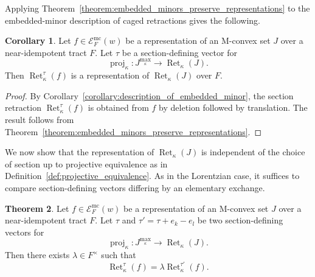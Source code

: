 \documentclass[11pt]{article}
\theoremstyle{definition}
\newtheorem{theorem}{Theorem}[section]
\newtheorem{corollary}[theorem]{Corollary}
\theoremstyle{remark}
\DeclareMathOperator{\proj}{proj}              %
\newcommand{\kproj}{\proj_{\kappa}}            %
\DeclareMathOperator{\Ret}{Ret}                %
\newcommand{\RetK}{\Ret_{\kappa}}              %
\newcommand{\Jmax}{J^{\max_{\kappa}}}
\begin{document}
Applying Theorem~\ref{theorem:embedded_minors_preserve_representations} to the embedded-minor description of caged retractions gives the following.

\begin{corollary}\label{corollary:section_retraction_representation}
    Let $f\in\mathcal{E}^{\mathrm{mc}}_F(w)$ be a representation of an M-convex set $J$ over a near-idempotent tract $F$. Let $\tau$ be a section-defining vector for
    \[
        \kproj\colon\Jmax\to\RetK(J).
    \]
    Then $\RetK^\tau(f)$ is a representation of $\RetK(J)$ over $F$.
\end{corollary}

\begin{proof}
    By Corollary~\ref{corollary:description_of_embedded_minor}, the section retraction $\RetK^\tau(f)$ is obtained from $f$ by deletion followed by translation. The result follows from Theorem~\ref{theorem:embedded_minors_preserve_representations}.
\end{proof}

We now show that the representation of $\RetK(J)$ is independent of the choice of section up to projective equivalence as in Definition~\ref{def:projective_equivalence}. As in the Lorentzian case, it suffices to compare section-defining vectors differing by an elementary exchange.

\begin{theorem}\label{theorem:representations_projective_equivalence}
    Let $f\in\mathcal{E}^{\mathrm{mc}}_F(w)$ be a representation of an M-convex set $J$ over a near-idempotent tract $F$. Let $\tau$ and $\tau'=\tau+e_k-e_l$ be two section-defining vectors for
    \[
        \kproj\colon\Jmax\to\RetK(J).
    \]
    Then there exists $\lambda\in F^\times$ such that
    \[
        \RetK^\tau(f)=\lambda\RetK^{\tau'}(f).
    \]
\end{theorem}
\end{document}
